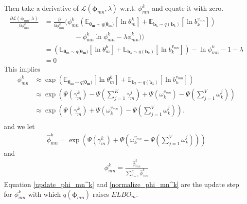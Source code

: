 \documentclass[a4]{article}
\begin{document}
Then take a derivative of $\mathcal{L}(\bm{\phi}_{mn}, \lambda)$
w.r.t. $\phi_{mn}^k$ and equate it with zero.
\begin{equation}
\begin{aligned}
    \frac{ \partial \mathcal{L}(\bm{\phi}_{mn}, \lambda) }
         { \partial \phi_{mn}^k }
&=
    \frac{\partial}{\partial\phi_{mn}^{k}} 
    \Big(
        \phi_{mn}^{k}
        \left( 
            \mathbb{E}_{\bm{\theta_m} \sim q(\bm{\theta_m)}}
                 [\ln \theta_m^k] 
               + \mathbb{E}_{\mathbf{b}_k \sim q(\mathbf{b}_k)}
                 [\ln b_{k}^{v_{mn}}]
        \right)\\
    &\:\:\:\:\:\:\:\:\:\:\:\:\:\:\:\:\:\:\:\:
    - \phi_{mn}^k \ln \phi_{mn}^k - \lambda \phi_{mn}^k)
    \Big)\\
&=
    \left( 
        \mathbb{E}_{\bm{\theta_m} \sim q(\bm{\theta_m)}}
        [\ln \theta_m^k] 
      + \mathbb{E}_{\mathbf{b}_k \sim q(\mathbf{b}_k)}
        [\ln b_{k}^{v_{mn}}]
    \right) - \ln \phi_{mn}^k - 1 - \lambda\\
&= 0
\end{aligned}
\end{equation}
This implies
\begin{equation}
\begin{aligned}
\phi_{mn}^k &\approx \exp
    \left( 
        \mathbb{E}_{\bm{\theta_m} \sim q(\bm{\theta_m)}}
        [\ln \theta_m^k] 
      + \mathbb{E}_{\mathbf{b}_k \sim q(\mathbf{b}_k)}
        [\ln b_{k}^{v_{mn}}]
    \right)\\
&\approx
    \exp \left( 
           \Psi( \gamma_{m}^k ) - \Psi( \sum_{j=1}^{K} \gamma_{m}^j )
         + \Psi( \omega_{k}^{v_{mn}} ) - \Psi( \sum_{j=1}^{V} \omega_{k}^j )
         \right)\\
&\approx
\exp \left(   \Psi( \gamma_{m}^k ) 
            + \Psi( \omega_{k}^{v_{mn}} ) 
            - \Psi( \sum_{j=1}^{V} \omega_{k}^j )
     \right).\\
\end{aligned}
\end{equation}
and we let 
\begin{equation}
\begin{aligned}
\hat{\phi}_{mn}^k = \exp \left( 
      \Psi( \gamma_{m}^k )
    + \Psi( \omega_{k}^{v_{mn}}
    - \Psi( \sum_{j=1}^{V} \omega_{k}^j ))
\right)\label{update_phi_mn^k}
\end{aligned}
\end{equation}
and
\begin{equation}
\begin{aligned}
\phi_{mn}^k = \frac{ \hat{\phi}_{mn}^k }
                   { \sum_{j=1}^K{\hat{\phi}_{mn}^k} }\label{normalize_phi_mn^k}
\end{aligned}
\end{equation}
Equation \ref{update_phi_mn^k} and \ref{normalize_phi_mn^k} are the update step for $\phi_{mn}^k$
with which $q(\bm{\phi}_{mn})$ raises $ELBO_m$.
\end{document}
